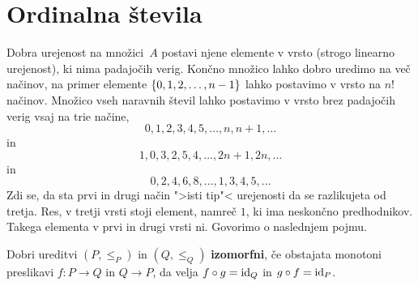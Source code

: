 \section{Ordinalna števila}
\label{sec:ordinalna-tevila}

Dobra urejenost na množici~$A$ postavi njene elemente v vrsto (strogo linearno urejenost), ki nima padajočih verig.
Končno množico lahko dobro uredimo na več načinov, na primer elemente $\set{0, 1, 2, \ldots, n-1}$ lahko postavimo v vrsto na $n!$ načinov. Množico vseh naravnih števil lahko postavimo v vrsto brez padajočih verig vsaj na trie načine,
%
\begin{equation*}
  0, 1, 2, 3, 4, 5, \ldots, n, n + 1, \ldots
\end{equation*}
%
in
%
\begin{equation*}
  1, 0, 3, 2, 5, 4, \ldots, 2 n + 1, 2 n, \ldots
\end{equation*}
%
in
%
\begin{equation*}
  0, 2, 4, 6, 8, \ldots, 1, 3, 4, 5, \ldots
\end{equation*}
%
Zdi se, da sta prvi in drugi način ">isti tip"< urejenosti da se razlikujeta od tretja. Res, v tretji vrsti stoji  element, namreč $1$, ki ima neskončno predhodnikov. Takega elementa v prvi in drugi vrsti ni. Govorimo o naslednjem pojmu.

\begin{definicija}
  Dobri ureditvi $(P, {\leq_P})$ in $(Q, {\leq_Q})$ \textbf{izomorfni}, če obstajata monotoni preslikavi $f : P \to Q$ in $Q \to P$, da velja $f \circ g = \id[Q]$ in $g \circ f = \id[P]$.
\end{definicija}

